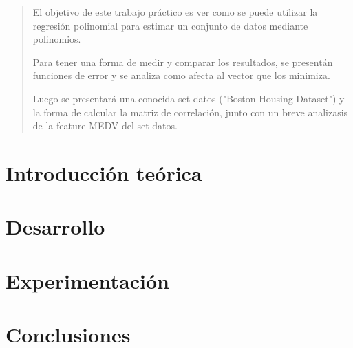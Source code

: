 \documentclass[12pt, a4paper]{report}
\begin{document}


\tableofcontents{}
\begin{abstract}
    El objetivo de este trabajo práctico es ver como se puede utilizar
la regresión polinomial para estimar un conjunto de datos mediante
polinomios. \par
\indent Para tener una forma de medir y comparar los resultados, 
se presentán funciones de error y se analiza como 
afecta al vector que los minimiza. \par 
\indent Luego se presentará una conocida
set datos ("Boston Housing Dataset") y la forma de calcular la matriz de
correlación, junto con un breve analizasis de la feature MEDV
del set datos.
\end{abstract}

\chapter{Introducción teórica} 


\chapter{Desarrollo}


\chapter{Experimentación}


\chapter{Conclusiones}

\end{document}
